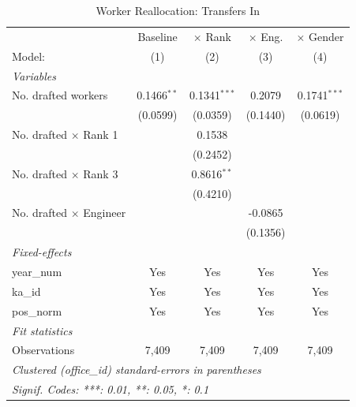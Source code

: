 \begin{table}[htbp]
\centering
\caption{Worker Reallocation: Transfers In}
\label{tab:reallocation}
\begin{threeparttable}
\begin{tabular}{lcccc}
   \tabularnewline \midrule \midrule
                                  & Baseline      & $\times$ Rank  & $\times$ Eng.  & $\times$ Gender \\    
   Model:                         & (1)           & (2)            & (3)            & (4)\\  
   \midrule
   \emph{Variables}\\
   No. drafted workers            & 0.1466$^{**}$ & 0.1341$^{***}$ & 0.2079         & 0.1741$^{***}$\\   
                                  & (0.0599)      & (0.0359)       & (0.1440)       & (0.0619)\\   
   No. drafted $\times$ Rank 1    &               & 0.1538         &                &   \\   
                                  &               & (0.2452)       &                &   \\   
   No. drafted $\times$ Rank 3    &               & 0.8616$^{**}$  &                &   \\   
                                  &               & (0.4210)       &                &   \\   
   No. drafted $\times$ Engineer  &               &                & -0.0865        &   \\   
                                  &               &                & (0.1356)       &   \\   
   \midrule
   \emph{Fixed-effects}\\
   year\_num                      & Yes           & Yes            & Yes            & Yes\\  
   ka\_id                         & Yes           & Yes            & Yes            & Yes\\  
   pos\_norm                      & Yes           & Yes            & Yes            & Yes\\  
   \midrule
   \emph{Fit statistics}\\
   Observations                   & 7,409         & 7,409          & 7,409          & 7,409\\  
   \midrule \midrule
   \multicolumn{5}{l}{\emph{Clustered (office\_id) standard-errors in parentheses}}\\
   \multicolumn{5}{l}{\emph{Signif. Codes: ***: 0.01, **: 0.05, *: 0.1}}\\

\end{tabular}
\end{threeparttable}
\end{table}
